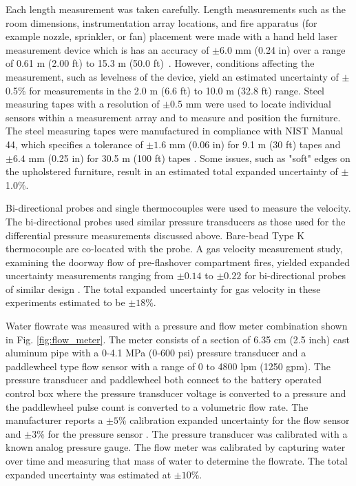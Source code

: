 \documentclass[12pt,oneside]{book}
\begin{document}
Each length measurement was taken carefully. Length measurements such as the room dimensions,
instrumentation array locations, and fire apparatus (for example nozzle, sprinkler, or fan) placement were made with a hand held laser measurement device which is has an accuracy of $\pm6.0$ mm (0.24 in) over a range of 0.61 m (2.00 ft) to 15.3 m (50.0 ft)~\cite{Stanley}. However, conditions affecting the measurement, such as levelness of the device, yield an estimated uncertainty of $\pm$0.5\% for measurements in the 2.0 m (6.6 ft) to 10.0 m (32.8 ft) range. Steel measuring tapes with a resolution of $\pm$0.5 mm were used to locate individual sensors within a measurement array and to measure and position the furniture. The steel measuring tapes were manufactured in compliance with NIST Manual 44, which specifies a tolerance of $\pm1.6$ mm (0.06 in) for 9.1 m (30 ft) tapes and $\pm6.4$ mm (0.25 in) for 30.5 m (100 ft) tapes \cite{NIST_Manual_44}. Some issues, such as "soft" edges on the upholstered furniture, result in an estimated total expanded uncertainty of $\pm$1.0\%. 

Bi-directional probes and single thermocouples were used to measure the velocity. The bi-directional probes used similar pressure transducers as those used for the differential pressure measurements discussed above. Bare-bead Type K thermocouple are co-located with the probe. A gas velocity measurement study, examining the doorway flow of pre-flashover compartment fires, yielded expanded uncertainty measurements ranging from $\pm0.14$ to $\pm0.22$ for bi-directional probes of similar design \cite{Bryant:FSJ2009}. The total expanded uncertainty for gas velocity in these experiments estimated to be $\pm18$\%.   

Water flowrate was measured with a pressure and flow meter combination shown in Fig. \ref{fig:flow_meter}. The meter consists of a section of 6.35 cm (2.5 inch) cast aluminum pipe with a 0-4.1 MPa (0-600 psi) pressure transducer and a paddlewheel type flow sensor with a range of 0 to 4800 lpm (1250 gpm). The pressure transducer and paddlewheel both connect to the battery operated control box where the pressure transducer voltage is converted to a pressure and the paddlewheel pulse count is converted to a volumetric flow rate. The manufacturer reports a $\pm5$\% calibration expanded uncertainty for the flow sensor and $\pm3$\%  for the pressure sensor \cite{Akron}. The pressure transducer was calibrated with a known analog pressure gauge. The flow meter was calibrated by capturing water over time and measuring that mass of water to determine the flowrate. The total expanded uncertainty was estimated at $\pm10$\%. 
\end{document}
